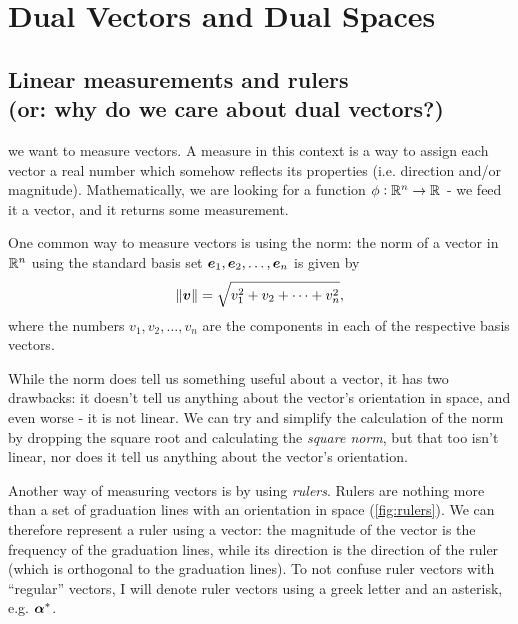 \section{Dual Vectors and Dual Spaces}

\subsection{Linear measurements and rulers\\(or: why do we care about dual vectors?)}
 we want to measure vectors. A measure in this context is a way to assign each vector a real number which somehow reflects its properties (i.e. direction and/or magnitude). Mathematically, we are looking for a function $\phi:\Rs[n]\to\Rs$ - we feed it a vector, and it returns some measurement.

One common way to measure vectors is using the norm: the norm of a vector in $\Rs[n]$ using the standard basis set $\eb{1},\eb{2},\dots,\eb{n}$ is given by
\begin{equation}
    \vnorm{v} = \sqrt{v_{1}^{2}+v_{2}+\dots+v_{n}^{2}},
    \label{eq:std_norm}
\end{equation}
where the numbers $v_{1},v_{2},\dots,v_{n}$ are the components in each of the respective basis vectors.

While the norm does tell us something useful about a vector, it has two drawbacks: it doesn't tell us anything about the vector's orientation in space, and even worse - it is not linear. We can try and simplify the calculation of the norm by dropping the square root and calculating the \textit{square norm}, but that too isn't linear, nor does it tell us anything about the vector's orientation.

Another way of measuring vectors is by using \textit{rulers}. Rulers are nothing more than a set of graduation lines with an orientation in space (\autoref{fig:rulers}). We can therefore represent a ruler using a vector: the magnitude of the vector is the frequency of the graduation lines, while its direction is the direction of the ruler (which is orthogonal to the graduation lines). To not confuse ruler vectors with \enquote{regular} vectors, I will denote ruler vectors using a greek letter and an asterisk, e.g. $\dualvec{\alpha}$.

